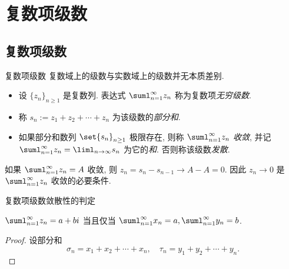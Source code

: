 \section{复数项级数}

\subsection{复数项级数}
\begin{frame}{复数项级数}
	\onslide<+->
	复数域上的级数与实数域上的级数并无本质差别.

	\onslide<+->
	\begin{definition}
		\begin{itemize}
			\item 设 $\{z_n\}_{n\ge1}$ 是复数列. 表达式 $\suml_{n=1}^\infty z_n$ 称为复数项\emph{无穷级数}.
			\item 称 $s_n:=z_1+z_2+\cdots+z_n$ 为该级数的\emph{部分和}.
			\item 如果部分和数列 $\set{s_n}_{n\ge 1}$ 极限存在, 则称 $\suml_{n=1}^\infty z_n$ \emph{收敛}, 并记 $\suml_{n=1}^\infty z_n=\liml_{n\to\infty}s_n$ 为它的\emph{和}. 否则称该级数\emph{发散}.
		\end{itemize}
	\end{definition}

	\onslide<+->
	如果 $\suml_{n=1}^\infty z_n=A$ 收敛, 则 $z_n=s_n-s_{n-1}\to A-A=0$.
	\onslide<+->
	因此 \alert{$z_n\to0$ 是 $\suml_{n=1}^\infty z_n$ 收敛的必要条件}.
\end{frame}


\begin{frame}{复数项级数敛散性的判定}
	\onslide<+->
	\begin{theorem}
		$\suml_{n=1}^\infty z_n=a+bi$ 当且仅当 $\suml_{n=1}^\infty x_n=a,\suml_{n=1}^\infty y_n=b$.
	\end{theorem}

	\onslide<+->
	\begin{proof}
		设部分和
	\[
		\sigma_n=x_1+x_2+\cdots+x_n,\quad
			\tau_n=y_1+y_2+\cdots+y_n.
	\]
		\onslide<+->{于是命题得证.\qedhere}
	\end{proof}
\end{frame}


